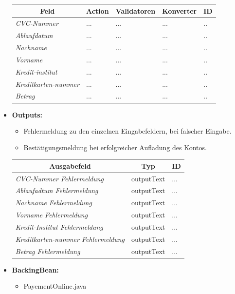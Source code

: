 \begin{itemize}
\begin{center}
\begin{longtable}{|p{3cm} |p{4cm} | p{4cm}|p{3cm} |p{2cm}|}
						\hline \multicolumn{1}{|c|}{\textbf{Feld}} & \multicolumn{1}{|c|}{\textbf{Action}} & \multicolumn{1}{|c|}{\textbf{Validatoren}}  &  \multicolumn{1}{|c|}{\textbf{Konverter}} &  \multicolumn{1}{|c|}{\textbf{ID}} \\ \hline
						\endfirsthead
						\hline
						\endlastfoot
						\textit{CVC-Nummer} & ... & ... & ... & ..\\ \hline
						\textit{Ablaufdatum} & ... & ... & ... & ..\\ \hline
						\textit{Nachname} & ... & ... & ... & ..\\ \hline
						\textit{Vorname} & ... & ... & ... & ..\\ \hline
						\textit{Kredit-institut} & ... & ... & ... & ..\\ \hline
						\textit{Kreditkarten-nummer} & ... & ... & ... & ..\\ \hline
						\textit{Betrag} & ... & ... & ... & ..\\ \hline
					\end{longtable}
				\end{center}
			\item \textbf{Outputs:}
			\begin{itemize}
				\item Fehlermeldung zu den einzelnen Eingabefeldern, bei falscher Eingabe.
				\item Bestätigungsmeldung bei erfolgreicher Aufladung des Kontos.
			\end{itemize}
					\begin{center}
						\begin{longtable}{|p{5cm} | p{4cm}|p{3cm}|}
							
							\hline \multicolumn{1}{|c|}{\textbf{Ausgabefeld}} & \multicolumn{1}{|c|}{\textbf{Typ}}  &  \multicolumn{1}{|c|}{\textbf{ID}} \\ \hline
							\endfirsthead
							\hline
							\endlastfoot
							\textit{CVC-Nummer Fehlermeldung}  & outputText & ... \\ \hline
							\textit{Ablaufadtum Fehlermeldung}  & outputText & ... \\ \hline
							\textit{Nachname Fehlermeldung}  & outputText & ... \\ \hline
							\textit{Vorname Fehlermeldung}  & outputText & ... \\ \hline
							\textit{Kredit-Institut Fehlermeldung}  & outputText & ... \\ \hline
							\textit{Kreditkarten-nummer Fehlermeldung}  & outputText & ... \\ \hline
							\textit{Betrag Fehlermeldung}  & outputText & ... \\ \hline
						\end{longtable}
					\end{center}
			\item \textbf{BackingBean:}
			\begin{itemize}
				\item PayementOnline.java
			\end{itemize}
		\end{itemize}
		
